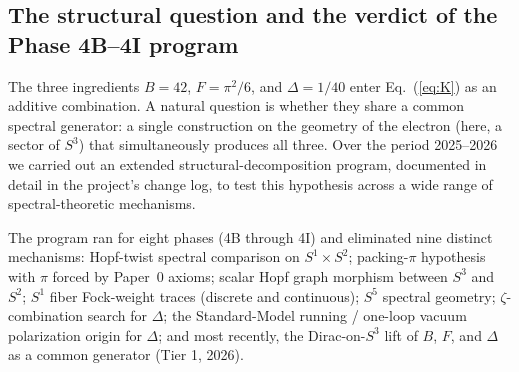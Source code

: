 \subsection{The structural question and the verdict of the Phase 4B--4I
program}\label{sec:structural_question}

The three ingredients $B = 42$, $F = \pi^2/6$, and $\Delta = 1/40$ enter
Eq.~(\ref{eq:K}) as an additive combination. A natural question is
whether they share a common spectral generator: a single construction
on the geometry of the electron (here, a sector of $S^3$) that
simultaneously produces all three. Over the period 2025--2026 we
carried out an extended structural-decomposition program, documented in
detail in the project's change log, to test this hypothesis across a
wide range of spectral-theoretic mechanisms.

The program ran for eight phases (4B through 4I) and eliminated nine
distinct mechanisms:
Hopf-twist spectral comparison on $S^1 \times S^2$;
packing-$\pi$ hypothesis with $\pi$ forced by Paper~0 axioms;
scalar Hopf graph morphism between $S^3$ and $S^2$;
$S^1$ fiber Fock-weight traces (discrete and continuous);
$S^5$ spectral geometry;
$\zeta$-combination search for $\Delta$;
the Standard-Model running / one-loop vacuum polarization origin for
$\Delta$;
and most recently, the Dirac-on-$S^3$ lift of $B$, $F$, and $\Delta$ as
a common generator (Tier 1, 2026).

